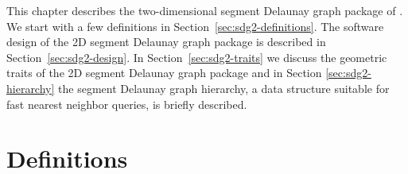 
This chapter describes the two-dimensional segment Delaunay graph
package of \cgal. We start with a few definitions in 
Section~\ref{sec:sdg2-definitions}.
The software design of the 2D segment Delaunay graph package is
described in Section~\ref{sec:sdg2-design}.
In Section~\ref{sec:sdg2-traits} we discuss the geometric
traits of the 2D segment Delaunay graph package and in Section
\ref{sec:sdg2-hierarchy} the segment Delaunay graph hierarchy, a
data structure suitable for fast nearest neighbor queries, is briefly
described.


\section{Definitions\label{sec:sdg2-definitions}}

